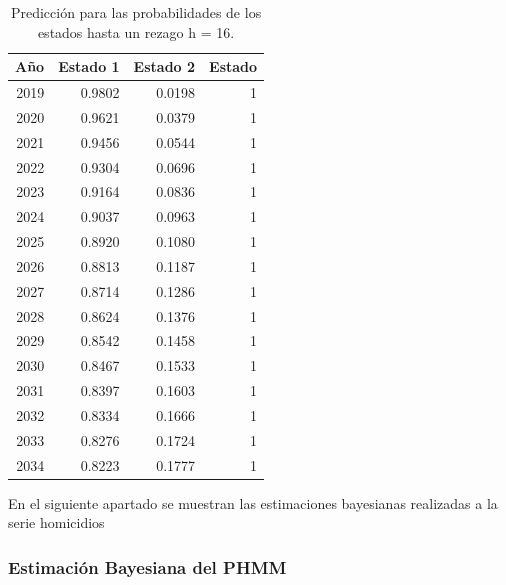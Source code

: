 \documentclass[a4paper]{article}\usepackage[]{graphicx}\usepackage[]{color}
\begin{document}
\begin{table}[ht]
\centering
\begin{tabular}{rrrr}
  \hline
Año & Estado 1 & Estado 2 & Estado \\ 
  \hline
 2019 & 0.9802 & 0.0198 &     1 \\ 
   2020 & 0.9621 & 0.0379 &     1 \\ 
   2021 & 0.9456 & 0.0544 &     1 \\ 
   2022 & 0.9304 & 0.0696 &     1 \\ 
   2023 & 0.9164 & 0.0836 &     1 \\ 
   2024 & 0.9037 & 0.0963 &     1 \\ 
   2025 & 0.8920 & 0.1080 &     1 \\ 
   2026 & 0.8813 & 0.1187 &     1 \\ 
   2027 & 0.8714 & 0.1286 &     1 \\ 
   2028 & 0.8624 & 0.1376 &     1 \\ 
   2029 & 0.8542 & 0.1458 &     1 \\ 
   2030 & 0.8467 & 0.1533 &     1 \\ 
   2031 & 0.8397 & 0.1603 &     1 \\ 
   2032 & 0.8334 & 0.1666 &     1 \\ 
   2033 & 0.8276 & 0.1724 &     1 \\ 
   2034 & 0.8223 & 0.1777 &     1 \\ 
   \hline
\end{tabular}
\caption{Predicción para las probabilidades de los estados hasta un rezago h = 16.} 
\end{table}


En el siguiente apartado se muestran las estimaciones bayesianas realizadas a la serie homicidios


\clearpage

\subsubsection*{Estimación Bayesiana del PHMM}
\end{document}
